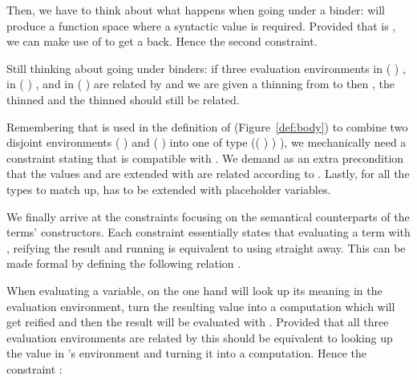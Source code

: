 
Then, we have to think about what happens when going under a binder: 
will produce a  function space where a syntactic
value is required. Provided that  is , we can make use of 
to get a  back. Hence the second constraint.


Still thinking about going under binders: if three evaluation environments
 in {( )  },  in
{( )  }, and  in {( )  }
are related by  and we are given a thinning  from  to 
then , the thinned  and the thinned  should still be related.


Remembering that \AF{\_>>\_} is used in the definition of  (Figure~\ref{def:body}) to
combine two disjoint environments {( )  } and
{( )  } into one of type
{(( \AF{++} ) )  )}, we mechanically need a
constraint stating that \AF{\_>>\_} is compatible with . We demand
as an extra precondition that the values  and  are extended
with are related according to . Lastly, for all the types to match up,
 has to be extended with placeholder variables.


We finally arrive at the constraints focusing on the semantical counterparts
of the terms' constructors. Each constraint essentially states that evaluating
a term with , reifying the result and running  is equivalent to
using  straight away. This can be made formal by defining the following
relation .


When evaluating a variable, on the one hand 
will look up its meaning in the evaluation environment, turn the resulting value into
a computation which will get reified and then the result will be evaluated with .
Provided that all three evaluation environments are related by  this should
be equivalent to looking up the value in 's environment and turning it into a
computation. Hence the constraint :

